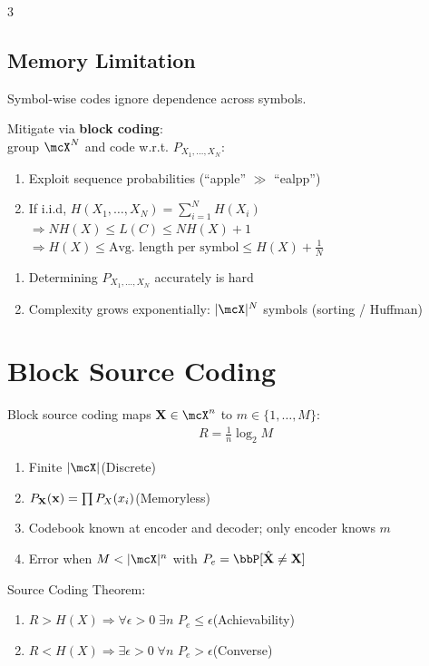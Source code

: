 \documentclass[12pt, a4paper]{article}
\begin{document}
\begin{multicols*}{3}
\subsection{Memory Limitation}
Symbol-wise codes ignore dependence across symbols.

Mitigate via \textbf{block coding}:\\group $\mcX^N$ and code w.r.t. $P_{X_1,\dots,X_N}$:
\begin{enumerate}[$+$]
  \item Exploit sequence probabilities (``apple'' $\gg$ ``ealpp'')
  \item If i.i.d, $H(X_1,\dots,X_N) = \sum^N_{i=1}H(X_i)$\\$\Rightarrow NH(X) \leq L(C) \leq NH(X) + 1$\\$\Rightarrow H(X)\leq\text{Avg. length per symbol} \leq H(X) + \frac{1}{N}$
\end{enumerate}
\begin{enumerate}[$-$]\vspace{3pt}
  \item Determining $P_{X_1,\dots,X_N}$ accurately is hard
  \item Complexity grows exponentially: $|\mcX|^N$ symbols (sorting / Huffman)
\end{enumerate}

\colbreak
\section{Block Source Coding}
Block source coding maps $\bX\in\mcX^n$ to $m\in\{1,\dots,M\}$:
\begin{align*}
  R=\tfrac{1}{n}\log_2 M 
\end{align*}
\begin{enumerate}[\roman*.]
  \item Finite $|\mcX|$\hfill(Discrete) 
  \item $P_{\mathbf{X}}(\mathbf{x})=\prod P_X(x_i)$\hfill(Memoryless)
  \item Codebook known at encoder and decoder; only encoder knows $m$
  \item Error when $M<|\mcX|^n$ with $P_e=\Pr[\hat\bX\neq\bX]$
\end{enumerate}
 
Source Coding Theorem:
\begin{enumerate}[\roman*.]
  \item $R>H(X)\Rightarrow\forall \epsilon > 0\;\exists n$ $P_e \leq \epsilon$\hfill(Achievability)
  \item $R<H(X)\Rightarrow \exists \epsilon > 0 \; \forall n$ $P_e > \epsilon$\hfill(Converse)
\end{enumerate}
 

\end{multicols*}
\end{document}
